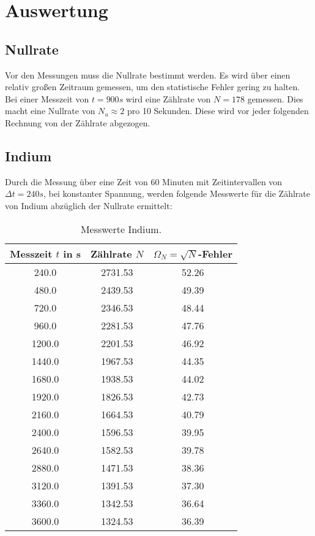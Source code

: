 \section{Auswertung}
\label{sec:Auswertung}

\subsection{Nullrate}
\label{sec:null}
Vor den Messungen muss die Nullrate bestimmt werden.
Es wird über einen relativ großen Zeitraum gemessen, um den statistische Fehler gering zu halten.
Bei einer Messzeit von $t = 900s$ wird eine Zählrate von $N = 178$ gemessen.
Dies macht eine Nullrate von $N_u \approx 2$ pro 10 Sekunden.
Diese wird vor jeder folgenden Rechnung von der Zählrate abgezogen.

\subsection{Indium}
\label{sec:indium}

Durch die Messung über eine Zeit von 60 Minuten mit Zeitintervallen von $\Delta t = 240s$, bei konstanter Spannung, werden folgende Messwerte für die Zählrate von Indium abzüglich der Nullrate ermittelt:

\begin{table}
  \centering
  \caption{Messwerte Indium.}
  \label{tab:N1}
\begin{tabular}{c c c}
  \toprule
  Messzeit $t$ in s & Zählrate $N$ & $\Omega_N = \sqrt{N}$-Fehler\\
  \midrule
  240.0 & 2731.53 & 52.26  \\
  480.0 & 2439.53 & 49.39  \\
  720.0 & 2346.53 & 48.44  \\
  960.0 & 2281.53 & 47.76  \\
  1200.0 & 2201.53 & 46.92  \\
  1440.0 & 1967.53 & 44.35  \\
  1680.0 & 1938.53 & 44.02  \\
  1920.0 & 1826.53 & 42.73  \\
  2160.0 & 1664.53 & 40.79  \\
  2400.0 & 1596.53 & 39.95  \\
  2640.0 & 1582.53 & 39.78  \\
  2880.0 & 1471.53 & 38.36  \\
  3120.0 & 1391.53 & 37.30  \\
  3360.0 & 1342.53 & 36.64  \\
  3600.0 & 1324.53 & 36.39  \\
  \bottomrule
\end{tabular}
\end{table}
\FloatBarrier

